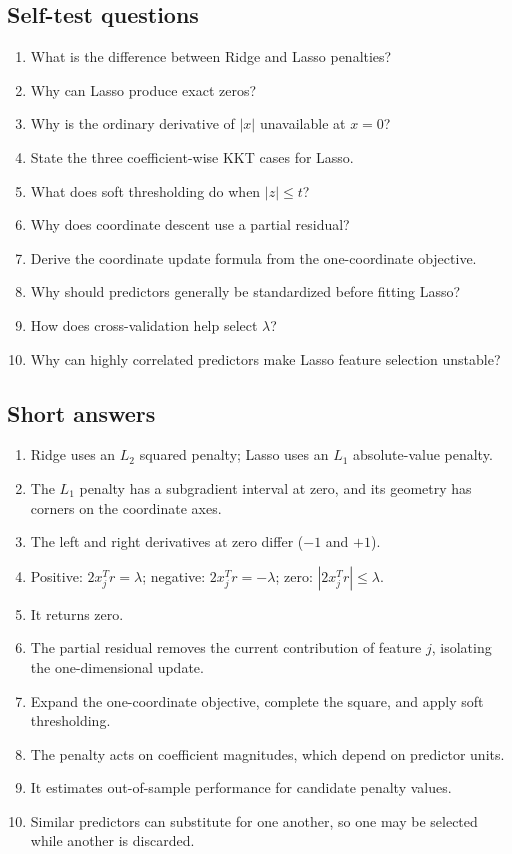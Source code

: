 \documentclass[11pt,a4paper]{article}
\numberwithin{equation}{section}
\newcommand{\abs}[1]{\left|#1\right|}
\begin{document}
\subsection{Self-test questions}
\begin{enumerate}
  \item What is the difference between Ridge and Lasso penalties?
  \item Why can Lasso produce exact zeros?
  \item Why is the ordinary derivative of $\abs{x}$ unavailable at $x=0$?
  \item State the three coefficient-wise KKT cases for Lasso.
  \item What does soft thresholding do when $\abs{z}\leq t$?
  \item Why does coordinate descent use a partial residual?
  \item Derive the coordinate update formula from the one-coordinate objective.
  \item Why should predictors generally be standardized before fitting Lasso?
  \item How does cross-validation help select $\lambda$?
  \item Why can highly correlated predictors make Lasso feature selection unstable?
\end{enumerate}

\subsection{Short answers}
\begin{enumerate}
  \item Ridge uses an $L_2$ squared penalty; Lasso uses an $L_1$ absolute-value penalty.
  \item The $L_1$ penalty has a subgradient interval at zero, and its geometry has corners on the coordinate axes.
  \item The left and right derivatives at zero differ ($-1$ and $+1$).
  \item Positive: $2x_j^Tr=\lambda$; negative: $2x_j^Tr=-\lambda$; zero: $\abs{2x_j^Tr}\leq\lambda$.
  \item It returns zero.
  \item The partial residual removes the current contribution of feature $j$, isolating the one-dimensional update.
  \item Expand the one-coordinate objective, complete the square, and apply soft thresholding.
  \item The penalty acts on coefficient magnitudes, which depend on predictor units.
  \item It estimates out-of-sample performance for candidate penalty values.
  \item Similar predictors can substitute for one another, so one may be selected while another is discarded.
\end{enumerate}
\end{document}
